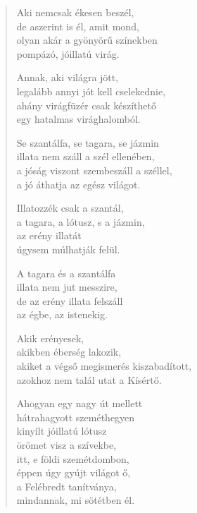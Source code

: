 \begin{verse}
 Aki nemcsak ékesen beszél,\\
de aszerint is él, amit mond,\\
olyan akár a gyönyörű színekben\\
pompázó, jóillatú virág.

 Annak, aki világra jött,\\
legalább annyi jót kell cselekednie,\\
ahány virágfüzér csak készíthető\\
egy hatalmas virághalomból.

 Se szantálfa, se tagara, se jázmin\\
illata nem száll a szél ellenében,\\
a jóság viszont szembeszáll a széllel,\\
a jó áthatja az egész világot.

 Illatozzék csak a szantál,\\
a tagara, a lótusz, s a jázmin,\\
az erény illatát\\
úgysem múlhatják felül.

 A tagara és a szantálfa\\
illata nem jut messzire,\\
de az erény illata felszáll\\
az égbe, az istenekig.

 Akik erényesek,\\
akikben éberség lakozik,\\
akiket a végső megismerés kiszabadított,\\
azokhoz nem talál utat a Kísértő.

 Ahogyan egy nagy út mellett\\
hátrahagyott szeméthegyen\\
kinyílt jóillatú lótusz\\
örömet visz a szívekbe,\\
itt, e földi szemétdombon,\\
éppen úgy gyújt világot ő,\\
a Felébredt tanítványa,\\
mindannak, mi sötétben él.

\end{verse}

